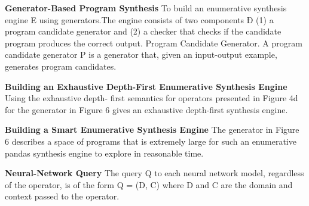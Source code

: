 \documentclass{article}
\begin{document}
\textbf{Generator-Based Program Synthesis} To build an enumerative synthesis engine E using generators.The engine consists of two components Ð (1) a program candidate generator and (2) a checker that checks if the candidate program produces the correct output. Program Candidate Generator. A program candidate generator P is a generator that, given an input-output example, generates program candidates.

\textbf{Building an Exhaustive Depth-First Enumerative Synthesis Engine} Using the exhaustive depth- first semantics for operators presented in Figure 4d for the generator in Figure 6 gives an exhaustive depth-first synthesis engine. 

\textbf{Building a Smart Enumerative Synthesis Engine} The generator in Figure 6 describes a space of programs that is extremely large for such an enumerative pandas synthesis engine to explore in reasonable time.

\textbf{Neural-Network Query} The query Q to each neural network model, regardless of the operator, is of the form Q = (D, C) where D and C are the domain and context passed to the operator.
\end{document}
